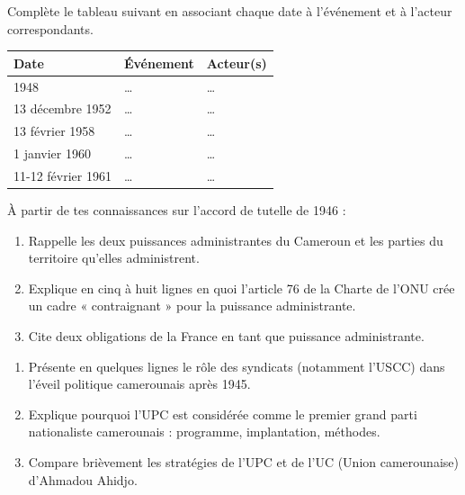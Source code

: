\documentclass[11pt]{article}
\newcounter{popsec}
\newcounter{popsub}
\newcommand{\courssub}[1]{%
  \stepcounter{popsub}%
  \par\vspace{9pt}\noindent{\popxbold\fontsize{11.5}{13}\selectfont\color{popink}{\color{poporange}\thepopsec.\thepopsub}\hspace{6pt}#1}\par\nopagebreak\vspace{4pt}
}
\begin{document}
\begin{exercice}
Complète le tableau suivant en associant chaque date à l'événement et à l'acteur correspondants.
\begin{center}
\begin{tabularx}{\linewidth}{|l|X|X|}
\hline
\rowcolor{popblueL} \textbf{Date} & \textbf{Événement} & \textbf{Acteur(s)} \\
\hline
1948 & \ldots & \ldots \\
\hline
13 décembre 1952 & \ldots & \ldots \\
\hline
13 février 1958 & \ldots & \ldots \\
\hline
1\ier{} janvier 1960 & \ldots & \ldots \\
\hline
11-12 février 1961 & \ldots & \ldots \\
\hline
\end{tabularx}
\end{center}
\end{exercice}

\courssub{Je m'entraîne}

\begin{exercice}
À partir de tes connaissances sur l'accord de tutelle de 1946 :
\begin{enumerate}
\item Rappelle les deux puissances administrantes du Cameroun et les parties du territoire qu'elles administrent.
\item Explique en cinq à huit lignes en quoi l'article 76 de la Charte de l'ONU crée un cadre « contraignant » pour la puissance administrante.
\item Cite deux obligations de la France en tant que puissance administrante.
\end{enumerate}
\end{exercice}

\begin{exercice}
\begin{enumerate}
\item Présente en quelques lignes le rôle des syndicats (notamment l'USCC) dans l'éveil politique camerounais après 1945.
\item Explique pourquoi l'UPC est considérée comme le premier grand parti nationaliste camerounais : programme, implantation, méthodes.
\item Compare brièvement les stratégies de l'UPC et de l'UC (Union camerounaise) d'Ahmadou Ahidjo.
\end{enumerate}
\end{exercice}
\end{document}
